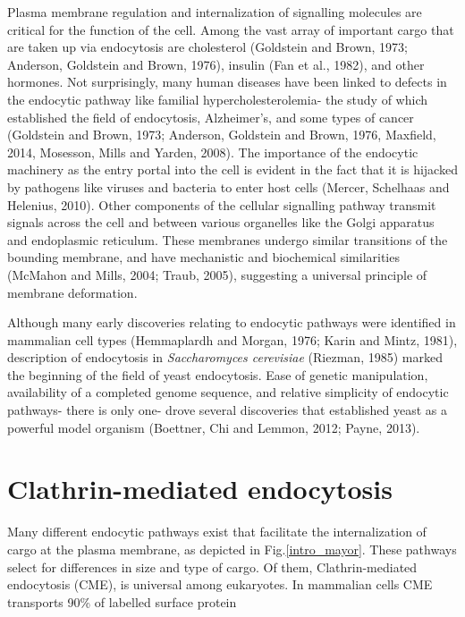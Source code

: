 \vspace{5mm}
Plasma membrane regulation and internalization of signalling molecules are critical for the function of the cell. Among the vast array of important cargo that are taken up via endocytosis are cholesterol (Goldstein and Brown, 1973; Anderson, Goldstein and Brown, 1976), insulin (Fan et al., 1982), and other hormones. Not surprisingly, many human diseases have been linked to defects in the endocytic pathway like familial hypercholesterolemia- the study of which established the field of endocytosis, Alzheimer’s, and some types of cancer (Goldstein and Brown, 1973; Anderson, Goldstein and Brown, 1976, Maxfield, 2014, Mosesson, Mills and Yarden, 2008). The importance of the endocytic machinery as the entry portal into the cell is evident in the fact that it is hijacked by pathogens like viruses and bacteria to enter host cells (Mercer, Schelhaas and Helenius, 2010). Other components of the cellular signalling pathway transmit signals across the cell and between various organelles like the Golgi apparatus and endoplasmic reticulum. These membranes undergo similar transitions of the bounding membrane, and have mechanistic and biochemical similarities (McMahon and Mills, 2004; Traub, 2005), suggesting a universal principle of membrane deformation. 

\vspace{5mm}
Although many early discoveries relating to endocytic pathways were identified in mammalian cell types (Hemmaplardh and Morgan, 1976; Karin and Mintz, 1981), description of endocytosis in \textit{Saccharomyces cerevisiae} (Riezman, 1985) marked the beginning of the field of yeast endocytosis. Ease of genetic manipulation, availability of a completed genome sequence, and relative simplicity of endocytic pathways- there is only one- drove several discoveries that established yeast as a powerful model organism (Boettner, Chi and Lemmon, 2012; Payne, 2013).



\section{Clathrin-mediated endocytosis}
Many different endocytic pathways exist that facilitate the internalization of cargo at the plasma membrane, as depicted in Fig.\ref{intro_mayor}. These pathways select for differences in size and type of cargo. Of them, Clathrin-mediated endocytosis (CME), is universal among eukaryotes. In mammalian cells CME transports 90\% of labelled surface protein

